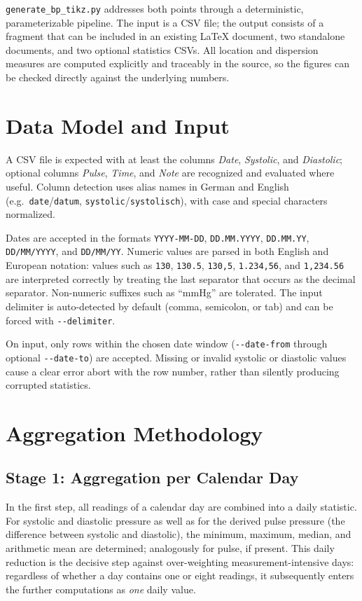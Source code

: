 \documentclass[conference]{IEEEtran}
\newcommand{\param}[1]{\texttt{#1}}
\begin{document}
\texttt{generate\_bp\_tikz.py} addresses both points through a deterministic,
parameterizable pipeline. The input is a CSV file; the output consists of a
fragment that can be included in an existing LaTeX document, two standalone
documents, and two optional statistics CSVs. All location and dispersion
measures are computed explicitly and traceably in the source, so the figures can
be checked directly against the underlying numbers.

\section{Data Model and Input}
A CSV file is expected with at least the columns \emph{Date}, \emph{Systolic},
and \emph{Diastolic}; optional columns \emph{Pulse}, \emph{Time}, and
\emph{Note} are recognized and evaluated where useful. Column detection uses
alias names in German and English (e.g.\ \texttt{date}/\texttt{datum},
\texttt{systolic}/\texttt{systolisch}), with case and special characters
normalized.

Dates are accepted in the formats \texttt{YYYY-MM-DD}, \texttt{DD.MM.YYYY},
\texttt{DD.MM.YY}, \texttt{DD/MM/YYYY}, and \texttt{DD/MM/YY}. Numeric values are
parsed in both English and European notation: values such as \texttt{130},
\texttt{130.5}, \texttt{130,5}, \texttt{1.234,56}, and \texttt{1,234.56} are
interpreted correctly by treating the last separator that occurs as the decimal
separator. Non-numeric suffixes such as ``mmHg'' are tolerated. The input
delimiter is auto-detected by default (comma, semicolon, or tab) and can be
forced with \param{-{}-delimiter}.

On input, only rows within the chosen date window (\param{-{}-date-from} through
optional \param{-{}-date-to}) are accepted. Missing or invalid systolic or
diastolic values cause a clear error abort with the row number, rather than
silently producing corrupted statistics.

\section{Aggregation Methodology}

\subsection{Stage 1: Aggregation per Calendar Day}
In the first step, all readings of a calendar day are combined into a daily
statistic. For systolic and diastolic pressure as well as for the derived pulse
pressure (the difference between systolic and diastolic), the minimum, maximum,
median, and arithmetic mean are determined; analogously for pulse, if present.
This daily reduction is the decisive step against over-weighting
measurement-intensive days: regardless of whether a day contains one or eight
readings, it subsequently enters the further computations as \emph{one} daily
value.
\end{document}
